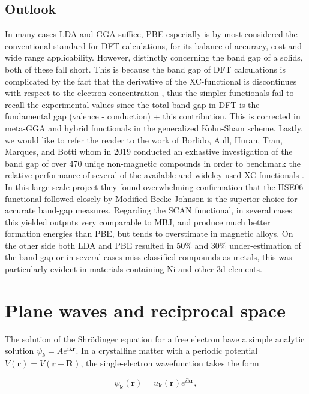 \subsection{Outlook} 
 
In many cases LDA and GGA suffice, PBE especially is by most considered the conventional standard for DFT calculations, for its balance of accuracy, cost and wide range applicability. However, distinctly concerning the band gap of a solids, both of these fall short. This is because the band gap of DFT calculations is complicated by the fact that the derivative of the XC-functional is discontinues with respect to the electron concentration \cite{xc_derivative}, thus the simpler functionals fail to recall the experimental values since the total band gap in DFT is the fundamental gap (valence - conduction) + this contribution. This is corrected in meta-GGA and hybrid functionals in the generalized Kohn-Sham scheme. Lastly, we would like to refer the reader to the work of Borlido, Aull, Huran, Tran, Marques, and Botti whom in 2019 conducted an exhastive investigation of the band gap of over 470 uniqe non-magnetic compounds in order to benchmark the relative performance of several of the available and wideley used XC-functionals \cite{xc_benchmark}. In this large-scale project they found overwhelming confirmation that the HSE06 functional followed closely by Modified-Becke Johnson is the superior choice for accurate band-gap measures. Regarding the SCAN functional, in several cases this yielded outputs very comparable to MBJ, and produce much better formation energies than PBE, but tends to overstimate in magnetic alloys. On the other side both LDA and PBE resulted in $50\%$ and $30\%$ under-estimation of the band gap or in several cases miss-classified compounds as metals, this was particularly evident in materials containing Ni and other 3d elements.  
 

\section{Plane waves and reciprocal space}

The solution of the Shr\"{o}dinger equation for a free electron have a simple analytic solution $\psi_k = Ae^{i\boldsymbol{k}\boldsymbol{r}}$. In a crystalline matter with a periodic potential $V(\boldsymbol{r}) = V(\boldsymbol{r} + \boldsymbol{R})$, the single-electron wavefunction takes the form 

\begin{equation}
\psi_{\boldsymbol{k}}(\boldsymbol{r}) = u_{\boldsymbol{k}}(\boldsymbol{r})e^{i\boldsymbol{k}\boldsymbol{r}},    
\end{equation}

